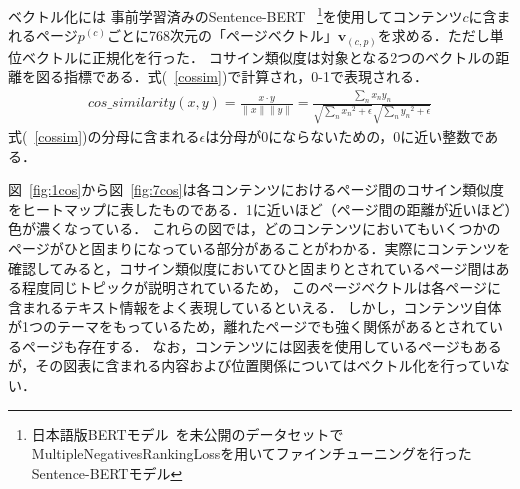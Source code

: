 \documentclass[a4paper,12pt]{ltjsreport}
\begin{document}
ベクトル化には
事前学習済みのSentence-BERT~\cite{sonoisa} \footnote{日本語版BERTモデル~\cite{touhoku}を未公開のデータセットでMultipleNegativesRankingLossを用いてファインチューニングを行ったSentence-BERTモデル}を使用してコンテンツ${c}$に含まれるページ${p^{(c)}}$ごとに768次元の「ページベクトル」$\bm{v}_{(c,p)}$を求める．ただし単位ベクトルに正規化を行った．
コサイン類似度は対象となる2つのベクトルの距離を図る指標である．式(~\ref{cossim})で計算され，0-1で表現される．
\begin{align}\label{cossim}
  cos\_similarity (x,y)  = \frac{x \cdot y}{\parallel x \parallel \parallel y \parallel} = \frac{\sum_n {x_n}{y_n}}{\sqrt{\sum_n {x_n}^2+\epsilon} \sqrt{\sum_n {y_n}^2+\epsilon}}
\end{align}
式(~\ref{cossim})の分母に含まれる$\epsilon$は分母が0にならないための，0に近い整数である．

図~\ref{fig:1cos}から図~\ref{fig:7cos}は各コンテンツにおけるページ間のコサイン類似度をヒートマップに表したものである．1に近いほど（ページ間の距離が近いほど）色が濃くなっている．
これらの図では，どのコンテンツにおいてもいくつかのページがひと固まりになっている部分があることがわかる．実際にコンテンツを確認してみると，コサイン類似度においてひと固まりとされているページ間はある程度同じトピックが説明されているため，
このページベクトルは各ページに含まれるテキスト情報をよく表現しているといえる．
しかし，コンテンツ自体が1つのテーマをもっているため，離れたページでも強く関係があるとされているページも存在する．
なお，コンテンツには図表を使用しているページもあるが，その図表に含まれる内容および位置関係についてはベクトル化を行っていない．
\end{document}
